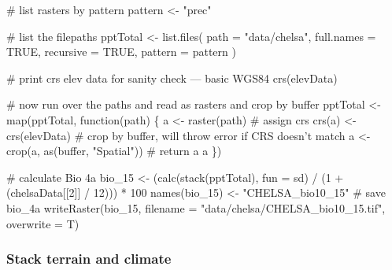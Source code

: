 \documentclass[
]{article}
\newenvironment{Shaded}{}{}
\newcommand{\CommentTok}[1]{\textcolor[rgb]{0.00,0.50,0.00}{#1}}
\newcommand{\ControlFlowTok}[1]{\textcolor[rgb]{0.00,0.00,1.00}{#1}}
\newcommand{\DataTypeTok}[1]{#1}
\newcommand{\DecValTok}[1]{#1}
\newcommand{\KeywordTok}[1]{\textcolor[rgb]{0.00,0.00,1.00}{#1}}
\newcommand{\NormalTok}[1]{#1}
\newcommand{\OperatorTok}[1]{#1}
\newcommand{\OtherTok}[1]{\textcolor[rgb]{1.00,0.25,0.00}{#1}}
\newcommand{\StringTok}[1]{\textcolor[rgb]{0.00,0.50,0.50}{#1}}
\begin{document}
\begin{Shaded}
\begin{Highlighting}[]
\CommentTok{# list rasters by pattern}
\NormalTok{pattern <-}\StringTok{ "prec"}

\CommentTok{# list the filepaths}
\NormalTok{pptTotal <-}\StringTok{ }\KeywordTok{list.files}\NormalTok{(}
  \DataTypeTok{path =} \StringTok{"data/chelsa"}\NormalTok{,}
  \DataTypeTok{full.names =} \OtherTok{TRUE}\NormalTok{,}
  \DataTypeTok{recursive =} \OtherTok{TRUE}\NormalTok{,}
  \DataTypeTok{pattern =}\NormalTok{ pattern}
\NormalTok{)}

\CommentTok{# print crs elev data for sanity check --- basic WGS84}
\KeywordTok{crs}\NormalTok{(elevData)}

\CommentTok{# now run over the paths and read as rasters and crop by buffer}
\NormalTok{pptTotal <-}\StringTok{ }\KeywordTok{map}\NormalTok{(pptTotal, }\ControlFlowTok{function}\NormalTok{(path) \{}
\NormalTok{  a <-}\StringTok{ }\KeywordTok{raster}\NormalTok{(path)}
  \CommentTok{# assign crs}
  \KeywordTok{crs}\NormalTok{(a) <-}\StringTok{ }\KeywordTok{crs}\NormalTok{(elevData)}
  \CommentTok{# crop by buffer, will throw error if CRS doesn't match}
\NormalTok{  a <-}\StringTok{ }\KeywordTok{crop}\NormalTok{(a, }\KeywordTok{as}\NormalTok{(buffer, }\StringTok{"Spatial"}\NormalTok{))}
  \CommentTok{# return a}
\NormalTok{  a}
\NormalTok{\})}

\CommentTok{# calculate Bio 4a}
\NormalTok{bio_}\DecValTok{15}\NormalTok{ <-}\StringTok{ }\NormalTok{(}\KeywordTok{calc}\NormalTok{(}\KeywordTok{stack}\NormalTok{(pptTotal), }\DataTypeTok{fun =}\NormalTok{ sd) }\OperatorTok{/}\StringTok{ }\NormalTok{(}\DecValTok{1} \OperatorTok{+}\StringTok{ }\NormalTok{(chelsaData[[}\DecValTok{2}\NormalTok{]] }\OperatorTok{/}\StringTok{ }\DecValTok{12}\NormalTok{))) }\OperatorTok{*}\StringTok{ }\DecValTok{100}
\KeywordTok{names}\NormalTok{(bio_}\DecValTok{15}\NormalTok{) <-}\StringTok{ "CHELSA_bio10_15"}
\CommentTok{# save bio_4a}
\KeywordTok{writeRaster}\NormalTok{(bio_}\DecValTok{15}\NormalTok{, }\DataTypeTok{filename =} \StringTok{"data/chelsa/CHELSA_bio10_15.tif"}\NormalTok{, }\DataTypeTok{overwrite =}\NormalTok{ T)}
\end{Highlighting}
\end{Shaded}

\hypertarget{stack-terrain-and-climate}{%
\subsubsection{Stack terrain and climate}\label{stack-terrain-and-climate}}
\end{document}

